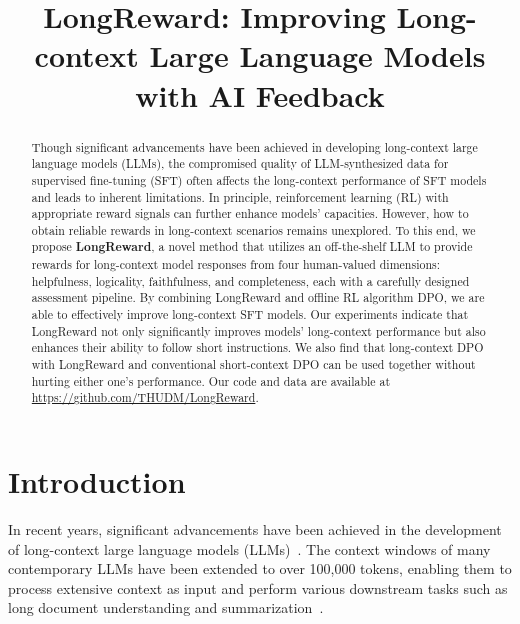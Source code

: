 \title{LongReward: Improving Long-context Large Language Models\\ with AI Feedback}



\maketitle

\renewcommand{\thefootnote}{\fnsymbol{footnote}}

\begin{abstract}
Though significant advancements have been achieved in developing long-context large language models (LLMs), the compromised quality of LLM-synthesized data for supervised fine-tuning (SFT) often affects the long-context performance of SFT models and leads to inherent limitations. In principle, reinforcement learning (RL) with appropriate reward signals can further enhance models' capacities. However, how to obtain reliable rewards in long-context scenarios remains unexplored. To this end, we propose \textbf{LongReward}, a novel method that utilizes an off-the-shelf LLM to provide rewards for long-context model responses from four human-valued dimensions: helpfulness, logicality, faithfulness, and completeness, each with a carefully designed assessment pipeline. By combining LongReward and offline RL algorithm DPO, we are able to effectively improve long-context SFT models. Our experiments indicate that LongReward not only significantly improves models' long-context performance but also enhances their ability to follow short instructions. We also find that long-context DPO with LongReward and conventional short-context DPO can be used together without hurting either one's performance. Our code and data are available at \url{https://github.com/THUDM/LongReward}.
\end{abstract}

\section{Introduction}
\label{sec:intro}
In recent years, significant advancements have been achieved in the development of long-context large language models (LLMs)~\cite{claude-35, glm4, reid2024gemini}.  The context windows of many contemporary LLMs have been extended to over 100,000 tokens, enabling them to process extensive context as input and perform various downstream tasks such as long document understanding and summarization~\cite{longbench}. 


